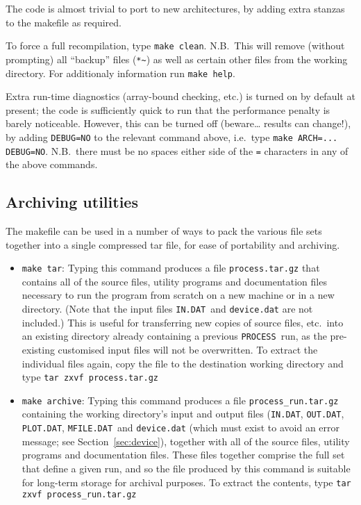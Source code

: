 \documentclass[11pt,a4paper]{report}
\newcommand{\indat}{\mbox{\texttt{IN.DAT}}}
\newcommand{\mfile}{\mbox{\texttt{MFILE.DAT}}}
\newcommand{\outdat}{\mbox{\texttt{OUT.DAT}}}
\newcommand{\plotdat}{\mbox{\texttt{PLOT.DAT}}}
\newcommand{\process}{\mbox{\texttt{PROCESS}}}
\begin{document}
The code is almost trivial to port to new architectures, by adding extra
stanzas to the makefile as required.

To force a full recompilation, type \texttt{make clean}. N.B.\ This will
remove (without prompting) all ``backup'' files (\texttt{*\~}) as well as
certain other files from the working directory. For additionaly information
run \texttt{make help}.

Extra run-time diagnostics (array-bound checking, etc.) is turned on by
default at present; the code is sufficiently quick to run that the performance
penalty is barely noticeable. However, this can be turned off (beware\ldots
results can change!), by adding \texttt{DEBUG=NO} to the relevant command
above, i.e.\ type \verb+make ARCH=... DEBUG=NO+.  N.B.\ there must be no
spaces either side of the \texttt{=} characters in any of the above commands.

\subsection{Archiving utilities}

The makefile can be used in a number of ways to pack the various file sets
together into a single compressed tar file, for ease of portability and
archiving.

\begin{itemize}

\item \texttt{make tar}: Typing this command produces a file
  \texttt{process.tar.gz} that contains all of the source files, utility
  programs and documentation files necessary to run the program from scratch
  on a new machine or in a new directory. (Note that the input files \indat\
  and \texttt{device.dat} are not included.) This is useful for transferring
  new copies of source files, etc.\ into an existing directory already
  containing a previous \process\ run, as the pre-existing customised input
  files will not be overwritten. To extract the individual files again, copy
  the file to the destination working directory and type
  \verb+tar zxvf process.tar.gz+

\item \texttt{make archive}: Typing this command produces a file
  \texttt{process\_run.tar.gz} containing the working directory's input and
  output files (\indat, \outdat, \plotdat, \mfile\ and \texttt{device.dat}
  (which must exist to avoid an error message; see Section~\ref{sec:device}),
  together with all of the source files, utility programs and documentation
  files. These files together comprise the full set that define a given run,
  and so the file produced by this command is suitable for long-term storage
  for archival purposes. To extract the contents, type
  \verb+tar zxvf process_run.tar.gz+
\end{itemize}
\end{document}

